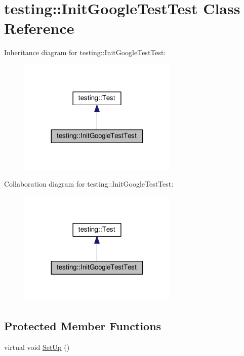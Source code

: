 \hypertarget{classtesting_1_1InitGoogleTestTest}{}\section{testing\+:\+:Init\+Google\+Test\+Test Class Reference}
\label{classtesting_1_1InitGoogleTestTest}


Inheritance diagram for testing\+:\+:Init\+Google\+Test\+Test\+:
\nopagebreak
\begin{figure}[H]
\begin{center}
\leavevmode
\includegraphics[width=215pt]{classtesting_1_1InitGoogleTestTest__inherit__graph}
\end{center}
\end{figure}


Collaboration diagram for testing\+:\+:Init\+Google\+Test\+Test\+:
\nopagebreak
\begin{figure}[H]
\begin{center}
\leavevmode
\includegraphics[width=215pt]{classtesting_1_1InitGoogleTestTest__coll__graph}
\end{center}
\end{figure}
\subsection*{Protected Member Functions}
\begin{DoxyCompactItemize}
\item 
virtual void \hyperlink{classtesting_1_1InitGoogleTestTest_a49de9e552ea788c4b79924ec4135ca7a}{Set\+Up} ()
\end{DoxyCompactItemize}
